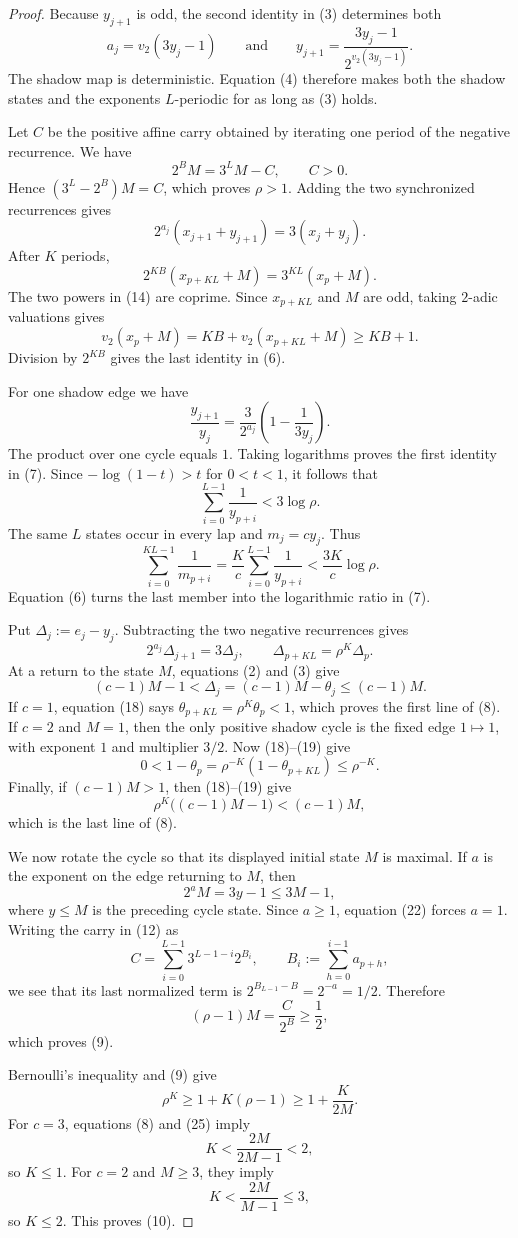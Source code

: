 \documentclass[11pt]{article}
\begin{document}
\begin{proof}
Because $y_{j+1}$ is odd, the second identity in (3) determines both
\[
  a_j=v_2(3y_j-1)
  \qquad\text{and}\qquad
  y_{j+1}=\frac{3y_j-1}{2^{v_2(3y_j-1)}}.
  \tag{11}
\]
The shadow map is deterministic.  Equation (4) therefore makes both the
shadow states and the exponents $L$-periodic for as long as (3) holds.

Let $C$ be the positive affine carry obtained by iterating one period of
the negative recurrence.  We have
\[
  2^BM=3^LM-C,
  \qquad C>0.
  \tag{12}
\]
Hence $(3^L-2^B)M=C$, which proves $\rho>1$.  Adding the two synchronized
recurrences gives
\[
  2^{a_j}(x_{j+1}+y_{j+1})=3(x_j+y_j).
  \tag{13}
\]
After $K$ periods,
\[
  2^{KB}(x_{p+KL}+M)=3^{KL}(x_p+M).
  \tag{14}
\]
The two powers in (14) are coprime.  Since $x_{p+KL}$ and $M$ are odd,
taking $2$-adic valuations gives
\[
  v_2(x_p+M)=KB+v_2(x_{p+KL}+M)\geq KB+1.
\]
Division by $2^{KB}$ gives the last identity in (6).

For one shadow edge we have
\[
  \frac{y_{j+1}}{y_j}
  =\frac3{2^{a_j}}
   \left(1-\frac1{3y_j}\right).
  \tag{15}
\]
The product over one cycle equals $1$.  Taking logarithms proves the first
identity in (7).  Since $-\log(1-t)>t$ for $0<t<1$, it follows that
\[
  \sum_{i=0}^{L-1}\frac1{y_{p+i}}<3\log\rho.
  \tag{16}
\]
The same $L$ states occur in every lap and $m_j=cy_j$.  Thus
\[
  \sum_{i=0}^{KL-1}\frac1{m_{p+i}}
  =\frac Kc\sum_{i=0}^{L-1}\frac1{y_{p+i}}
  <\frac{3K}{c}\log\rho.
  \tag{17}
\]
Equation (6) turns the last member into the logarithmic ratio in (7).

Put $\Delta_j:=e_j-y_j$.  Subtracting the two negative recurrences gives
\[
  2^{a_j}\Delta_{j+1}=3\Delta_j,
  \qquad
  \Delta_{p+KL}=\rho^K\Delta_p.
  \tag{18}
\]
At a return to the state $M$, equations (2) and (3) give
\[
  (c-1)M-1<\Delta_j=(c-1)M-\theta_j\leq(c-1)M.
  \tag{19}
\]
If $c=1$, equation (18) says
$\theta_{p+KL}=\rho^K\theta_p<1$, which proves the first line of (8).
If $c=2$ and $M=1$, then the only positive shadow cycle is the fixed edge
$1\mapsto1$, with exponent $1$ and multiplier $3/2$.  Now (18)--(19) give
\[
  0<1-\theta_p
  =\rho^{-K}(1-\theta_{p+KL})
  \leq\rho^{-K}.
  \tag{20}
\]
Finally, if $(c-1)M>1$, then (18)--(19) give
\[
  \rho^K\bigl((c-1)M-1\bigr)<(c-1)M,
  \tag{21}
\]
which is the last line of (8).

We now rotate the cycle so that its displayed initial state $M$ is maximal.
If $a$ is the exponent on the edge returning to $M$, then
\[
  2^aM=3y-1\leq3M-1,
  \tag{22}
\]
where $y\leq M$ is the preceding cycle state.  Since $a\geq1$, equation
(22) forces $a=1$.  Writing the carry in (12) as
\[
  C=\sum_{i=0}^{L-1}3^{L-1-i}2^{B_i},
  \qquad
  B_i:=\sum_{h=0}^{i-1}a_{p+h},
  \tag{23}
\]
we see that its last normalized term is
$2^{B_{L-1}-B}=2^{-a}=1/2$.  Therefore
\[
  (\rho-1)M=\frac C{2^B}\geq\frac12,
  \tag{24}
\]
which proves (9).

Bernoulli's inequality and (9) give
\[
  \rho^K\geq1+K(\rho-1)\geq1+\frac K{2M}.
  \tag{25}
\]
For $c=3$, equations (8) and (25) imply
\[
  K<\frac{2M}{2M-1}<2,
\]
so $K\leq1$.  For $c=2$ and $M\geq3$, they imply
\[
  K<\frac{2M}{M-1}\leq3,
\]
so $K\leq2$.  This proves (10).
\end{proof}
\end{document}
